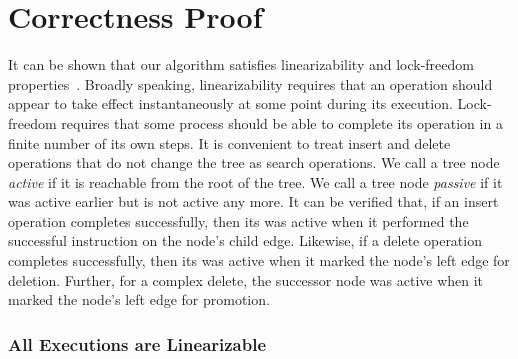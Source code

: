 \section{Correctness Proof}
It can be shown that our algorithm satisfies linearizability and lock-freedom properties~\cite{HerSha:2012:Book}. Broadly speaking, linearizability requires that an operation should appear to take effect instantaneously at some point during its execution.  Lock-freedom requires that some process should be able to complete its operation in a finite number of its own steps.
It is convenient to treat insert and delete operations that do not change the tree as search operations. 
We call a tree node \emph{active} if it is reachable from the root of the tree. We call a tree node  \emph{passive} if it was active earlier but is not active any more.
It can be verified that, if an insert operation completes successfully, then  its \targetnode{} was active when it performed the successful \CAS{} instruction on the node's child edge.
Likewise, if a delete operation completes successfully, then its \targetnode{} was active when it marked the node's left edge for deletion. Further, for a complex delete, 
the successor node was active when it marked the node's left edge for promotion.




\subsubsection{All Executions are Linearizable}

